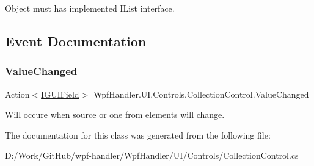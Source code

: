Object must has implemented I\+List interface. 

\subsection{Event Documentation}
\mbox{\label{class_wpf_handler_1_1_u_i_1_1_controls_1_1_collection_control_a7c24ead5af7dadce18f017f0a93706a2}} 
\subsubsection{\texorpdfstring{Value\+Changed}{ValueChanged}}
{\footnotesize\ttfamily Action$<$\mbox{\hyperlink{interface_wpf_handler_1_1_u_i_1_1_auto_layout_1_1_i_g_u_i_field}{I\+G\+U\+I\+Field}}$>$ Wpf\+Handler.\+U\+I.\+Controls.\+Collection\+Control.\+Value\+Changed}



Will occure when source or one from elements will change. 



The documentation for this class was generated from the following file\+:\begin{DoxyCompactItemize}
\item 
D\+:/\+Work/\+Git\+Hub/wpf-\/handler/\+Wpf\+Handler/\+U\+I/\+Controls/Collection\+Control.\+cs\end{DoxyCompactItemize}
